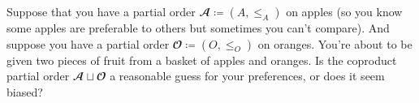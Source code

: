 \documentclass[../main/CT4S-EN-RU]{subfiles}
\begin{document}
\begin{exampleRUS}
\end{exampleRUS}

\begin{exerciseENG}
Suppose that you have a partial order ${𝓐}{\coloneqq}(A,\leq_A)$ on apples (so you know some apples are preferable to others but sometimes you can't compare). And suppose you have a partial order ${𝓞}{\coloneqq}(O,\leq_O)$ on oranges. You're about to be given two pieces of fruit from a basket of apples and oranges. Is the coproduct partial order ${𝓐}\sqcup{𝓞}$ a reasonable guess for your preferences, or does it seem biased?
\end{exerciseENG}

\begin{exerciseRUS}
\end{exerciseRUS}
\end{document}
